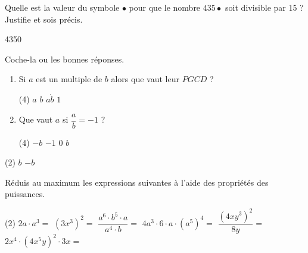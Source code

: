 \documentclass[parskip=half-,twoside=semi, DIV=12, 12pt]{scrartcl}
\begin{document}
\begin{transferer}[points=3]
    Quelle est la valeur du symbole \(\bullet\) pour que le nombre \(435\bullet\) soit divisible par 15 ? Justifie et sois précis.
    \vfill
\end{transferer}
\begin{soltransferer}
    \num{4350}
\end{soltransferer}
\begin{connaitre}[points=2]
    Coche-la ou les bonnes réponses.
    \begin{enumerate}
        \item Si \(a\) est un multiple de \(b\) alors que vaut leur \(PGCD\) ?
              \begin{tasks}[label=\faSquare](4)
                  \task  \(a\)
                  \task \(b\)
                  \task \(a \dot b\)
                  \task \(1\)
              \end{tasks}

        \item Que vaut \(a\) si \(\dfrac{a}{b}=-1\) ?
              \begin{tasks}[label=\faSquare](4)
                  \task \(-b\)
                  \task \(-1\)
                  \task \(0\)
                  \task \(b\)
              \end{tasks}
    \end{enumerate}
\end{connaitre}
\begin{solconnaitre}
    \begin{tasks}(2)
        \task \(b\)
        \task \(-b\)
    \end{tasks}
\end{solconnaitre}
\newpage
\begin{appliquer}[points=6]
    Réduis au maximum les expressions suivantes à l'aide des propriétés des puissances.
    \begin{tasks}[after-item-skip=2cm](2)
        \task \(2a \cdot a^{3} =\)
        \task \(\left( 3x^{3} \right)^{2} =\)
        \task \(\dfrac{a^{6} \cdot b^{5} \cdot a}{a^{4} \cdot b} =\)
        \task \(4a^{3} \cdot 6 \cdot a \cdot \left( a^{5} \right)^{4} =\)
        \task \(\dfrac{\left( 4xy^{3} \right)^{2}}{8y} =\)
        \task \(2x^{4} \cdot \left( 4x^{5}y \right)^{2} \cdot 3x =\)
    \end{tasks}
    \vspace{2cm}
\end{appliquer}
\end{document}

